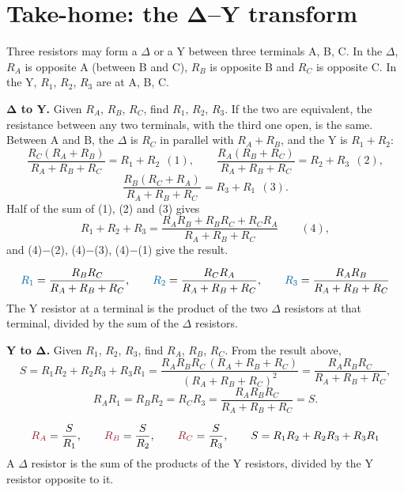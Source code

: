 \documentclass[11pt,a4paper]{article}
\newcommand{\Icol}[1]{\textcolor{ccur}{#1}}
\newcommand{\SD}{R_A + R_B + R_C}
\newcommand{\hlpair}[1]{%
  \ifcase#1\or
    \node[hterm] at (0,0) {}; \node[hterm] at (3,0) {};
  \or
    \node[hterm] at (3,0) {}; \node[hterm] at (1.5,2.5) {};
  \or
    \node[hterm] at (1.5,2.5) {}; \node[hterm] at (0,0) {};
  \fi}
\newcommand{\Dlt}[1]{%
  \draw (0,0) to[R] (3,0) to[R] (1.5,2.5) to[R] (0,0);
  \node[font=\small] at (1.5,-0.45) {$R_C$};
  \node[font=\small] at (2.85,1.6) {$R_A$};
  \node[font=\small] at (0.15,1.6) {$R_B$};
  \draw (0,0) node[ocirc] {} node[left=2pt, tlab] {A};
  \draw (3,0) node[ocirc] {} node[right=2pt, tlab] {B};
  \draw (1.5,2.5) node[ocirc] {} node[above=2pt, tlab] {C};
  \hlpair{#1}}
\newcommand{\Wye}[1]{%
  \draw (0,0) to[R] (1.5,0.95); \draw (3,0) to[R] (1.5,0.95);
  \draw (1.5,2.5) to[R] (1.5,0.95);
  \fill (1.5,0.95) circle (1.6pt);
  \node[font=\small] at (0.55,0.98) {$R_1$};
  \node[font=\small] at (2.45,0.98) {$R_2$};
  \node[font=\small] at (1.95,1.8) {$R_3$};
  \draw (0,0) node[ocirc] {} node[left=2pt, tlab] {A};
  \draw (3,0) node[ocirc] {} node[right=2pt, tlab] {B};
  \draw (1.5,2.5) node[ocirc] {} node[above=2pt, tlab] {C};
  \hlpair{#1}}
\begin{document}
\clearpage
\appendix
\section{Take-home: the $\boldsymbol{\Delta}$--Y transform}

Three resistors may form a $\Delta$ or a Y between three terminals A, B, C. In the $\Delta$,
$R_A$ is opposite A (between B and C), $R_B$ is opposite B and $R_C$ is opposite C. In the Y,
$R_1$, $R_2$, $R_3$ are at A, B, C.

\begin{center}
\end{center}

\textbf{$\boldsymbol{\Delta}$ to Y.} Given $R_A$, $R_B$, $R_C$, find $R_1$, $R_2$, $R_3$. If the
two are equivalent, the resistance between any two terminals, with the third one open, is the
same. Between A and B, the $\Delta$ is $R_C$ in parallel with $R_A + R_B$, and the Y is
$R_1 + R_2$:
\[
  \frac{R_C(R_A + R_B)}{\SD} = R_1 + R_2 \ \ (1), \qquad
  \frac{R_A(R_B + R_C)}{\SD} = R_2 + R_3 \ \ (2),
\]
\[
  \frac{R_B(R_C + R_A)}{\SD} = R_3 + R_1 \ \ (3).
\]
Half of the sum of (1), (2) and (3) gives
\[
  R_1 + R_2 + R_3 = \frac{R_A R_B + R_B R_C + R_C R_A}{\SD} \qquad (4),
\]
and (4)$-$(2), (4)$-$(3), (4)$-$(1) give the result.

\begin{ideabox}[$\Delta$ to Y]
\[
  \Icol{R_1} = \frac{R_B R_C}{\SD}, \qquad
  \Icol{R_2} = \frac{R_C R_A}{\SD}, \qquad
  \Icol{R_3} = \frac{R_A R_B}{\SD}
\]
The Y resistor at a terminal is the product of the two $\Delta$ resistors at that terminal,
divided by the sum of the $\Delta$ resistors.
\end{ideabox}

\textbf{Y to $\boldsymbol{\Delta}$.} Given $R_1$, $R_2$, $R_3$, find $R_A$, $R_B$, $R_C$. From
the result above,
\[
  S = R_1R_2 + R_2R_3 + R_3R_1 = \frac{R_A R_B R_C\,(\SD)}{(\SD)^2} = \frac{R_A R_B R_C}{\SD},
\]
\[
  R_A R_1 = R_B R_2 = R_C R_3 = \frac{R_A R_B R_C}{\SD} = S .
\]

\begin{ideabox}[Y to $\Delta$]
\[
  \textcolor{metured}{R_A} = \frac{S}{R_1}, \qquad
  \textcolor{metured}{R_B} = \frac{S}{R_2}, \qquad
  \textcolor{metured}{R_C} = \frac{S}{R_3}, \qquad
  S = R_1R_2 + R_2R_3 + R_3R_1
\]
A $\Delta$ resistor is the sum of the products of the Y resistors, divided by the Y resistor
opposite to it.
\end{ideabox}
\end{document}
